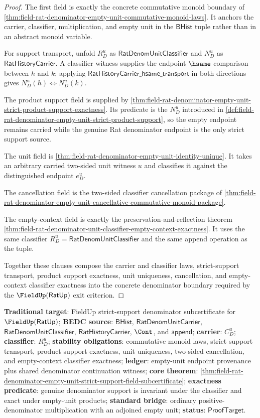 \begin{proof}
The first field is exactly the concrete commutative monoid boundary of
\autoref{thm:field-rat-denominator-empty-unit-commutative-monoid-laws}. It
anchors the carrier, classifier, multiplication, and empty unit in the
$\mathsf{BHist}$ tuple rather than in an abstract monoid variable.

For support transport, unfold $R_D^u$ as
$\mathsf{RatDenomUnitClassifier}$ and $N_D^u$ as
$\mathsf{RatHistoryCarrier}$. A classifier witness supplies the endpoint
$\hsame$ comparison between $h$ and $k$; applying
$\mathsf{RatHistoryCarrier\_hsame\_transport}$ in both directions gives
$N_D^u(h)\Longleftrightarrow N_D^u(k)$.

The product support field is supplied by
\autoref{thm:field-rat-denominator-empty-unit-strict-product-support-exactness}.
Its predicate is the $N_D^u$ introduced in
\autoref{def:field-rat-denominator-empty-unit-strict-product-support}, so the
empty endpoint remains carried while the genuine Rat denominator endpoint is the
only strict support source.

The unit field is
\autoref{thm:field-rat-denominator-empty-unit-identity-unique}. It takes an
arbitrary carried two-sided unit witness $u$ and classifies it against the
distinguished endpoint $e_D^u$.

The cancellation field is the two-sided classifier cancellation package of
\autoref{thm:field-rat-denominator-empty-unit-cancellative-commutative-monoid-package}.

The empty-context field is exactly the preservation-and-reflection theorem
\autoref{thm:field-rat-denominator-unit-classifier-empty-context-exactness}.
It uses the same classifier $R_D^u=\mathsf{RatDenomUnitClassifier}$ and the
same append operation as the tuple.

Together these clauses compose the carrier and classifier laws, strict-support
transport, product support exactness, unit uniqueness, cancellation, and
empty-context classifier exactness into the concrete denominator boundary
required by the $\FieldUp(\mathsf{RatUp})$ exit criterion.
\end{proof}

\textbf{Traditional target}: FieldUp strict-support denominator subcertificate
for $\FieldUp(\mathsf{RatUp})$; \textbf{BEDC source}: $\mathsf{BHist}$,
$\mathsf{RatDenomUnitCarrier}$, $\mathsf{RatDenomUnitClassifier}$,
$\mathsf{RatHistoryCarrier}$, $\Cont$, and $\mathsf{append}$; \textbf{carrier}:
$C_D^u$; \textbf{classifier}: $R_D^u$; \textbf{stability obligations}:
commutative monoid laws, strict support transport, product support
exactness, unit uniqueness, two-sided cancellation, and empty-context classifier
exactness; \textbf{ledger}: empty-unit endpoint provenance plus shared
denominator continuation witness; \textbf{core theorem}:
\autoref{thm:field-rat-denominator-empty-unit-strict-support-field-subcertificate};
\textbf{exactness predicate}: genuine denominator support is invariant under the
classifier and exact under empty-unit products; \textbf{standard bridge}:
ordinary positive-denominator multiplication with an adjoined empty unit;
\textbf{status}: $\mathsf{ProofTarget}$.
